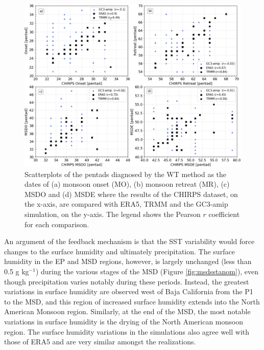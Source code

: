 \begin{figure}[t!]
\includegraphics[width=\linewidth]{figures/master_sst_scatter.png}
\caption[Scatter plot of SST vs precipitation]{Scatterplots of the pentads diagnosed by the WT method as the dates of (a) monsoon onset (MO), (b) monsoon retreat (MR), (c) MSDO and (d) MSDE where the results of the CHIRPS dataset, on the x-axis, are compared with ERA5, TRMM and the GC3-amip simulation, on the y-axis. The legend shows the Pearson $r$ coefficient for each comparison. }
\label{fig:amipsstscatter}
\end{figure}


An argument of the feedback mechanism is that the SST variability would force changes to the surface humidity and ultimately precipitation. The surface humidity in the EP and MSD regions, however, is largely unchanged (less than 0.5 g kg$^{-1}$) during the various stages of the MSD (Figure \ref{fig:msdsstanom}), even though precipitation varies notably during these periods. Instead, the greatest variations in surface humidity are observed west of Baja California from the P1 to the MSD, and this region of increased surface humidity extends into the North American Monsoon region. Similarly, at the end of the MSD, the most notable variations in surface humidity is the drying of the North American monsoon region.
 The surface humidity variations in the simulations also agree well with those of ERA5 and are very similar amongst the realizations.



